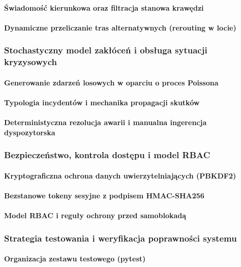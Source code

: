 \documentclass[twoside]{projektInzynierskiMS1z}
\begin{document}
    \paragraph{Świadomość kierunkowa oraz filtracja stanowa krawędzi}
    \paragraph{Dynamiczne przeliczanie tras alternatywnych (rerouting w locie)}
\subsubsection{Stochastyczny model zakłóceń i obsługa sytuacji kryzysowych}
    \paragraph{Generowanie zdarzeń losowych w oparciu o proces Poissona}
    \paragraph{Typologia incydentów i mechanika propagacji skutków}
    \paragraph{Deterministyczna rezolucja awarii i manualna ingerencja dyspozytorska}
\subsubsection{Bezpieczeństwo, kontrola dostępu i model RBAC}
    \paragraph{Kryptograficzna ochrona danych uwierzytelniających (PBKDF2)}
    \paragraph{Bezstanowe tokeny sesyjne z podpisem HMAC-SHA256}
    \paragraph{Model RBAC i reguły ochrony przed samoblokadą}
\subsubsection{Strategia testowania i weryfikacja poprawności systemu}
    \paragraph{Organizacja zestawu testowego (pytest)}
\end{document}
